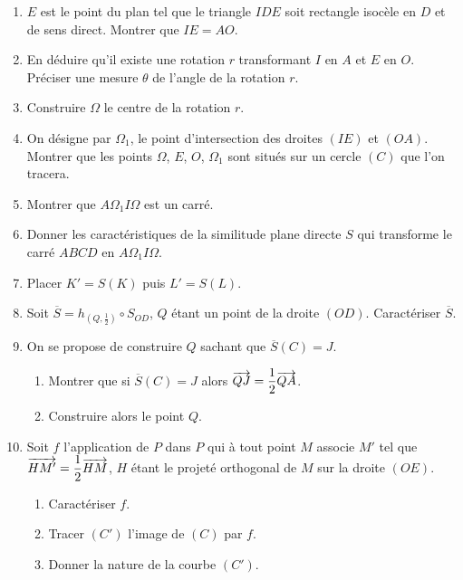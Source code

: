 \documentclass[11pt]{article}
\begin{document}
\begin{enumerate}
  \item $E$ est le point du plan tel que le triangle $IDE$ soit rectangle isocèle en $D$ et de sens direct. Montrer que $IE = AO$.
  \item En déduire qu'il existe une rotation $r$ transformant $I$ en $A$ et $E$ en $O$. Préciser une mesure $\theta$ de l'angle de la rotation $r$.
  \item Construire $\Omega$ le centre de la rotation $r$.
  \item On désigne par $\Omega_1$, le point d'intersection des droites $(IE)$ et $(OA)$. Montrer que les points $\Omega$, $E$, $O$, $\Omega_1$ sont situés sur un cercle $(C)$ que l'on tracera.
  \item Montrer que $A\Omega_1 I\Omega$ est un carré.
  \item Donner les caractéristiques de la similitude plane directe $S$ qui transforme le carré $ABCD$ en $A\Omega_1 I\Omega$.
  \item Placer $K' = S(K)$ puis $L' = S(L)$.
  \item Soit $\overline{S} = h_{(Q,\frac{1}{2})} \circ S_{OD}$, $Q$ étant un point de la droite $(OD)$. Caractériser $\overline{S}$.
  \item On se propose de construire $Q$ sachant que $\overline{S}(C) = J$.
  \begin{enumerate}[label=\alph*.]
    \item Montrer que si $\overline{S}(C) = J$ alors $\overrightarrow{QJ} = \dfrac{1}{2}\overrightarrow{QA}$.
    \item Construire alors le point $Q$.
  \end{enumerate}
  \item Soit $f$ l'application de $P$ dans $P$ qui à tout point $M$ associe $M'$ tel que $\overrightarrow{HM'} = \dfrac{1}{2}\overrightarrow{HM}$, $H$ étant le projeté orthogonal de $M$ sur la droite $(OE)$.
  \begin{enumerate}[label=\alph*.]
    \item Caractériser $f$.
    \item Tracer $(C')$ l'image de $(C)$ par $f$.
    \item Donner la nature de la courbe $(C')$.
  \end{enumerate}
\end{enumerate}
\end{document}

